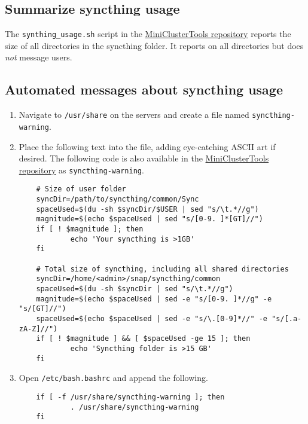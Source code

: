 \subsection{Summarize syncthing usage} \label{subsec:syncsize}

The \texttt{synthing\_usage.sh} script in the \href{https://github.com/coyleej/MiniClusterTools}{MiniClusterTools repository} reports the size of all directories in the syncthing folder. It reports on all directories but does \emph{not} message users.  

\subsection{Automated messages about syncthing usage} \label{subsec:syncautomessage}

\begin{enumerate}
\item Navigate to \texttt{/usr/share} on the servers and create a file named \texttt{syncthing-warning}.

\item Place the following text into the file, adding eye-catching ASCII art if desired. The following code is also available in the \href{https://github.com/coyleej/MiniClusterTools}{MiniClusterTools repository} as \texttt{syncthing-warning}.
	\begin{verbatim}
	# Size of user folder
	syncDir=/path/to/syncthing/common/Sync
	spaceUsed=$(du -sh $syncDir/$USER | sed "s/\t.*//g")
	magnitude=$(echo $spaceUsed | sed "s/[0-9. ]*[GT]//")
	if [ ! $magnitude ]; then
	        echo 'Your syncthing is >1GB'
	fi

	# Total size of syncthing, including all shared directories
	syncDir=/home/<admin>/snap/syncthing/common
	spaceUsed=$(du -sh $syncDir | sed "s/\t.*//g")
	magnitude=$(echo $spaceUsed | sed -e "s/[0-9. ]*//g" -e "s/[GT]//")
	spaceUsed=$(echo $spaceUsed | sed -e "s/\.[0-9]*//" -e "s/[.a-zA-Z]//")
	if [ ! $magnitude ] && [ $spaceUsed -ge 15 ]; then
	        echo 'Syncthing folder is >15 GB'
	fi
	\end{verbatim}

\item Open \texttt{/etc/bash.bashrc} and append the following.

	\begin{verbatim}
	if [ -f /usr/share/syncthing-warning ]; then
	        . /usr/share/syncthing-warning
	fi
	\end{verbatim}
\end{enumerate}
